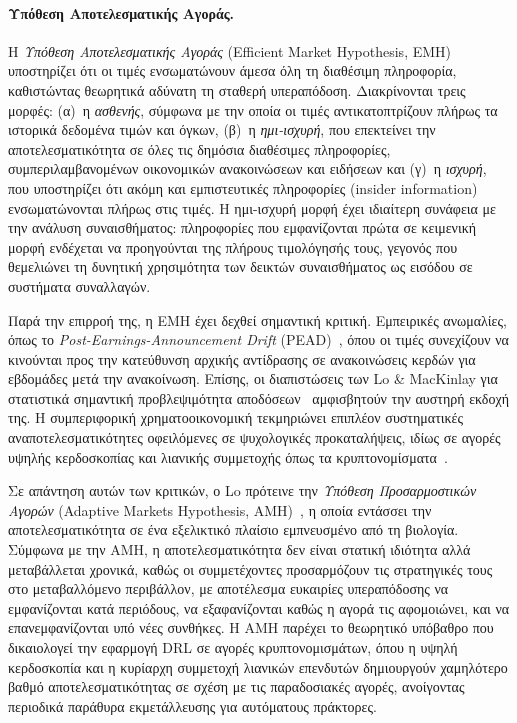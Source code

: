 \paragraph{Υπόθεση Αποτελεσματικής Αγοράς.}
Η \emph{Υπόθεση Αποτελεσματικής Αγοράς} (Efficient Market Hypothesis,
EMH)~\cite{fama1970emh, fama1969adjustment, malkiel2003efficient} υποστηρίζει
ότι οι τιμές ενσωματώνουν άμεσα όλη τη διαθέσιμη πληροφορία, καθιστώντας
θεωρητικά αδύνατη τη σταθερή υπεραπόδοση. Διακρίνονται τρεις μορφές:
(α)~η \emph{ασθενής}, σύμφωνα με την οποία οι τιμές αντικατοπτρίζουν πλήρως
τα ιστορικά δεδομένα τιμών και όγκων,
(β)~η \emph{ημι-ισχυρή}, που επεκτείνει την αποτελεσματικότητα σε όλες τις
δημόσια διαθέσιμες πληροφορίες, συμπεριλαμβανομένων οικονομικών ανακοινώσεων
και ειδήσεων και
(γ)~η \emph{ισχυρή}, που υποστηρίζει ότι ακόμη και εμπιστευτικές πληροφορίες
(insider information) ενσωματώνονται πλήρως στις τιμές.
Η ημι-ισχυρή μορφή έχει ιδιαίτερη συνάφεια με την ανάλυση συναισθήματος:
πληροφορίες που εμφανίζονται πρώτα σε κειμενική μορφή ενδέχεται να προηγούνται
της πλήρους τιμολόγησής τους, γεγονός που θεμελιώνει τη δυνητική χρησιμότητα
των δεικτών συναισθήματος ως εισόδου σε συστήματα συναλλαγών.

Παρά την επιρροή της, η EMH έχει δεχθεί σημαντική κριτική. Εμπειρικές
ανωμαλίες, όπως το \emph{Post-Earnings-Announcement Drift}
(PEAD)~\cite{bernard1989pead}, όπου οι τιμές συνεχίζουν να κινούνται προς
την κατεύθυνση αρχικής αντίδρασης σε ανακοινώσεις κερδών για εβδομάδες μετά
την ανακοίνωση. Επίσης, οι διαπιστώσεις των Lo \& MacKinlay για στατιστικά
σημαντική προβλεψιμότητα αποδόσεων~\cite{lo2011non} αμφισβητούν την αυστηρή
εκδοχή της. Η συμπεριφορική χρηματοοικονομική τεκμηριώνει επιπλέον
συστηματικές αναποτελεσματικότητες οφειλόμενες σε ψυχολογικές προκαταλήψεις,
ιδίως σε αγορές υψηλής κερδοσκοπίας και λιανικής συμμετοχής όπως τα
κρυπτονομίσματα~\cite{malkiel2003efficient, griffin2020bitcoin}.

Σε απάντηση αυτών των κριτικών, ο Lo πρότεινε την \emph{Υπόθεση Προσαρμοστικών
Αγορών} (Adaptive Markets Hypothesis, AMH)~\cite{lo2004adaptive, lo2017adaptive}, η οποία
εντάσσει την αποτελεσματικότητα σε ένα εξελικτικό πλαίσιο εμπνευσμένο από τη
βιολογία. Σύμφωνα με την AMH, η αποτελεσματικότητα δεν είναι στατική ιδιότητα
αλλά μεταβάλλεται χρονικά, καθώς οι συμμετέχοντες προσαρμόζουν τις στρατηγικές τους
στο μεταβαλλόμενο περιβάλλον, με αποτέλεσμα ευκαιρίες υπεραπόδοσης να
εμφανίζονται κατά περιόδους, να εξαφανίζονται καθώς η αγορά τις αφομοιώνει,
και να επανεμφανίζονται υπό νέες συνθήκες. Η AMH παρέχει το θεωρητικό υπόβαθρο που δικαιολογεί την εφαρμογή DRL σε
αγορές κρυπτονομισμάτων, όπου η υψηλή κερδοσκοπία και η κυρίαρχη συμμετοχή
λιανικών επενδυτών δημιουργούν χαμηλότερο βαθμό αποτελεσματικότητας σε σχέση
με τις παραδοσιακές αγορές, ανοίγοντας περιοδικά παράθυρα εκμετάλλευσης για
αυτόματους πράκτορες.



